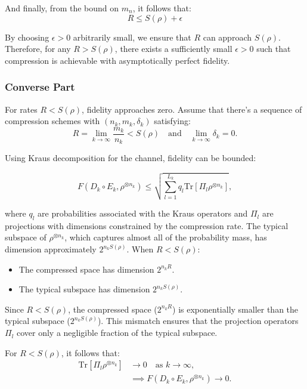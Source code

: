 And finally, from the bound on \(m_n\), it follows that:
\[
R \leq S(\rho) + \epsilon
\]

By choosing \(\epsilon > 0\) arbitrarily small, we ensure that \(R\) can approach \(S(\rho)\). Therefore, for any \(R > S(\rho)\), there exists a sufficiently small \(\epsilon > 0\) such that compression is achievable with asymptotically perfect fidelity.

\subsubsection{Converse Part}
For rates \(R < S(\rho)\), fidelity approaches zero. Assume that there's a sequence of compression schemes with \((n_k, m_k, \delta_k)\) satisfying:
\[
R = \lim_{k \to \infty} \frac{m_k}{n_k} < S(\rho) \quad \text{and} \quad \lim_{k \to \infty} \delta_k = 0.
\]

\begin{flushleft}
Using Kraus decomposition for the channel, fidelity can be bounded:
\end{flushleft}
\[
F(D_k \circ E_k, \rho^{\otimes n_k}) \leq \sqrt{\sum_{l=1}^{L_k} q_l \text{Tr}[\Pi_l \rho^{\otimes n_k}]},
\]

\begin{flushleft}
where \(q_l\) are probabilities associated with the Kraus operators and \(\Pi_l\) are projections with dimensions constrained by the compression rate.
\newline
\newline
The typical subspace of \(\rho^{\otimes n_k}\), which captures almost all of the probability mass, has dimension approximately \(2^{n_k S(\rho)}\). When \(R < S(\rho)\):
\end{flushleft}

\begin{itemize}
    \item The compressed space has dimension \(2^{n_k R}\).
    \item The typical subspace has dimension \(2^{n_k S(\rho)}\).
\end{itemize}

\begin{flushleft}
Since \(R < S(\rho)\), the compressed space (\(2^{n_k R}\)) is exponentially smaller than the typical subspace (\(2^{n_k S(\rho)}\)). This mismatch ensures that the projection operators \(\Pi_l\) cover only a negligible fraction of the typical subspace.
\end{flushleft}

For \(R < S(\rho)\), it follows that:
\[
\begin{aligned}
    \text{Tr}[\Pi_l \rho^{\otimes n_k}] &\to 0 \quad \text{as } k \to \infty, \\
    &\implies F(D_k \circ E_k, \rho^{\otimes n_k}) \to 0.
\end{aligned}
\]
